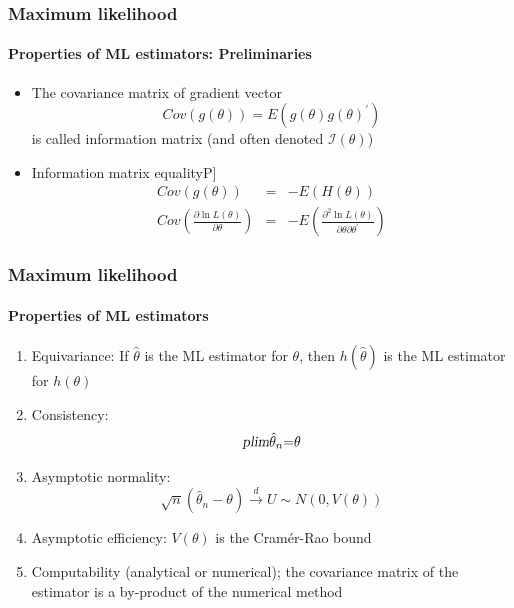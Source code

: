 \documentclass[notes=show]{beamer}
\begin{document}
\begin{frame}\frametitle{Maximum likelihood}\framesubtitle{Properties of ML estimators: Preliminaries}
\begin{itemize}
    \item The covariance matrix of gradient vector%
    \begin{equation*}
        Cov\left( g\left( \theta \right) \right) =E\left( g\left( \theta \right) g\left( \theta \right) ^{\prime }\right)
    \end{equation*}
    is called information matrix (and often denoted $\mathcal{I}(\theta )$)
    \item Information matrix equality\hfill \lbrack P]
    \begin{eqnarray*}
    Cov\left( g\left( \theta \right) \right) &=&-E\left( H\left( \theta \right)\right) \\
    Cov\left( \frac{\partial \ln L\left( \theta \right) }{\partial \theta }\right) &=&-E\left( \frac{\partial ^{2}\ln L\left( \theta \right) }{\partial\theta \partial \theta ^{\prime }}\right)
    \end{eqnarray*}
\end{itemize}
\end{frame}


\begin{frame}\frametitle{Maximum likelihood}\framesubtitle{Properties of ML estimators}
\begin{enumerate}
    \item Equivariance: If $\hat{\theta}$ is the ML estimator for $\theta $, then $h(\hat{\theta})$ is the ML estimator for $h(\theta )$
    \item Consistency:
    \begin{equation*}
        \textsl{plim}\hat{\theta}_{n}\mathbf{=}\theta
    \end{equation*}
    \item Asymptotic normality:
    \begin{equation*}
        \sqrt{n}\left( \hat{\theta}_{n}-\theta \right) \overset{d}{\rightarrow }  U\sim N\left( 0,V\left( \theta \right) \right)
    \end{equation*}
    \item Asymptotic efficiency: $V\left( {\theta }\right) $ is the Cram\'{e}r-Rao bound
    \item Computability (analytical or numerical); the covariance matrix of the estimator is a by-product of the numerical method
\end{enumerate}
\end{frame}
\end{document}
